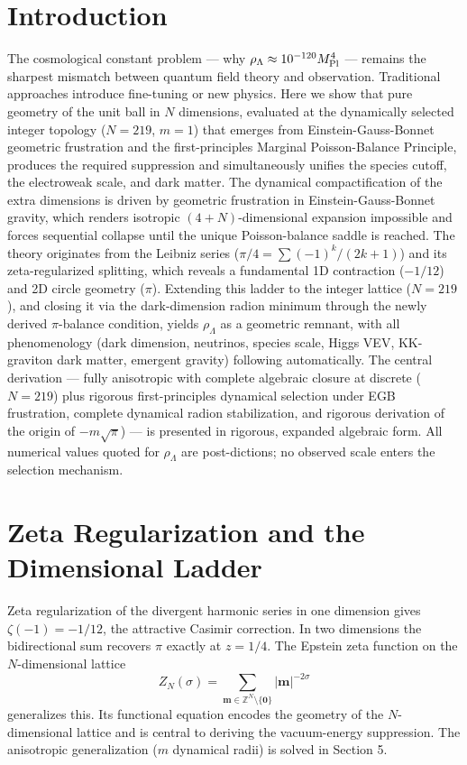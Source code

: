 \documentclass[12pt,a4paper]{article}
\begin{document}
\section{Introduction}
The cosmological constant problem — why \(\rho_\Lambda \approx 10^{-120} M_{\rm Pl}^4\) — remains the sharpest mismatch between quantum field theory and observation. Traditional approaches introduce fine-tuning or new physics. Here we show that pure geometry of the unit ball in \(N\) dimensions, evaluated at the dynamically selected integer topology (\(N=219\), \(m=1\)) that emerges from Einstein-Gauss-Bonnet geometric frustration and the first-principles Marginal Poisson-Balance Principle, produces the required suppression and simultaneously unifies the species cutoff, the electroweak scale, and dark matter. The dynamical compactification of the extra dimensions is driven by geometric frustration in Einstein-Gauss-Bonnet gravity, which renders isotropic \((4+N)\)-dimensional expansion impossible and forces sequential collapse until the unique Poisson-balance saddle is reached. The theory originates from the Leibniz series (\(\pi/4 = \sum (-1)^k/(2k+1)\)) and its zeta-regularized splitting, which reveals a fundamental 1D contraction (\(-1/12\)) and 2D circle geometry (\(\pi\)). Extending this ladder to the integer lattice (\(N=219\)), and closing it via the dark-dimension radion minimum through the newly derived \(\pi\)-balance condition, yields \(\rho_\Lambda\) as a geometric remnant, with all phenomenology (dark dimension, neutrinos, species scale, Higgs VEV, KK-graviton dark matter, emergent gravity) following automatically. The central derivation — fully anisotropic with complete algebraic closure at discrete (\(N=219\)) plus rigorous first-principles dynamical selection under EGB frustration, complete dynamical radion stabilization, and rigorous derivation of the origin of \(-m\sqrt{\pi}\)) — is presented in rigorous, expanded algebraic form. All numerical values quoted for \(\rho_\Lambda\) are post-dictions; no observed scale enters the selection mechanism.
 
\section{Zeta Regularization and the Dimensional Ladder}
Zeta regularization of the divergent harmonic series in one dimension gives \(\zeta(-1) = -1/12\), the attractive Casimir correction. In two dimensions the bidirectional sum recovers \(\pi\) exactly at \(z=1/4\). The Epstein zeta function on the \(N\)-dimensional lattice
\[
Z_N(\sigma) = \sum_{\mathbf{m} \in \mathbb{Z}^N \setminus \{\mathbf{0}\}} |\mathbf{m}|^{-2\sigma}
\]
generalizes this. Its functional equation encodes the geometry of the \(N\)-dimensional lattice and is central to deriving the vacuum-energy suppression. The anisotropic generalization (\(m\) dynamical radii) is solved in Section 5.
\end{document}
